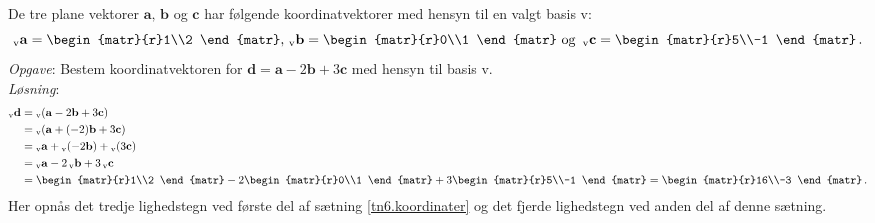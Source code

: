 \begin{example}
De tre plane vektorer $\mathbf a,\,\mathbf b$ og $\mathbf c$ har følgende koordinatvektorer med hensyn til en valgt basis v:
\begin{equation}
{_\mathrm{v}\mathbf{a}}=\begin{matr}{r}1\\2 \end{matr},\,
{_\mathrm{v}\mathbf{b}}=\begin{matr}{r}0\\1 \end{matr}\,\,\mathrm{og}\,\,\,
{_\mathrm{v}\mathbf{c}}=\begin{matr}{r}5\\-1 \end{matr}\,.
\end{equation}
\textit{Opgave}: Bestem koordinatvektoren for $\mathbf d=\mathbf a-2\mathbf b+3\mathbf c$ med hensyn til basis v.\\
\textit{Løsning}: 
\begin{align*}
{_\mathrm{v}\mathbf{d}}&={_\mathrm{v}(\mathbf{a}-2\mathbf{b}+3\mathbf{c})}\\
&={_\mathrm{v}(\mathbf{a}+(-2)\mathbf{b}+3\mathbf{c})}\\
&={_\mathrm{v}\mathbf{a}}+{_\mathrm{v}(-2\mathbf{b})}+{_\mathrm{v}(3\mathbf{c})}\\
&={_\mathrm{v}\mathbf{a}}-2\,{_\mathrm{v}\mathbf{b}}+3\,{_\mathrm{v}\mathbf{c}}\\
&=\begin{matr}{r}1\\2 \end{matr}-2\begin{matr}{r}0\\1 \end{matr}+3\begin{matr}{r}5\\-1 \end{matr}=\begin{matr}{r}16\\-3 \end{matr}\,.
\end{align*}
Her opnås det tredje lighedstegn ved første del af sætning \ref{tn6.koordinater} og det fjerde lighedstegn ved anden del af denne sætning.
\end{example}

